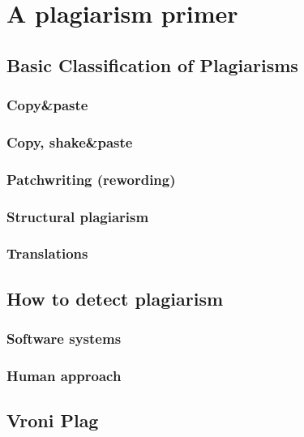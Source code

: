 ﻿\chapter{A plagiarism primer}\label{chap:plagOverview}

\section{Basic Classification of Plagiarisms}

\subsection{Copy\&paste}
\subsection{Copy, shake\&paste}
\subsection{Patchwriting (rewording)}
\subsection{Structural plagiarism}
\subsection{Translations}

\section{How to detect plagiarism}
\subsection{Software systems}
\subsection{Human approach}

\section{Vroni Plag}
